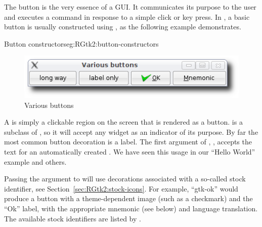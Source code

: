 The button is the very essence of a GUI. It communicates its purpose
to the user and executes a command in response to a simple click or
key press. In \GTK\/, a basic button is usually constructed using
, as the following example demonstrates.

\begin{example}{Button constructors}{eg:RGtk2:button-constructors}
\begin{Schunk}
\end{Schunk}
\end{example}

\begin{figure}
  \centering
  \includegraphics[width=.8\textwidth]{RGtk2-various-button}
  \caption{Various buttons}
  \label{fig:RGtk2:various-buttons}
\end{figure}

A  is simply a clickable region on the screen that is
rendered as a button.  is a subclass of
, so it will accept any widget as an indicator of its
purpose. By far the most common button decoration is a label. The
first argument of ,
, accepts the text for an automatically
created . We have seen this usage in our ``Hello
World'' example and others.

Passing the  argument to
 will use decorations associated with a so-called
stock identifier, see Section~\ref{sec:RGtk2:stock-icons}. For
example, ``gtk-ok'' would produce a button with a theme-dependent
image (such as a checkmark) and the ``Ok'' label, with the appropriate
mnemonic (see below) and language translation.  The available stock
identifiers are listed by .

